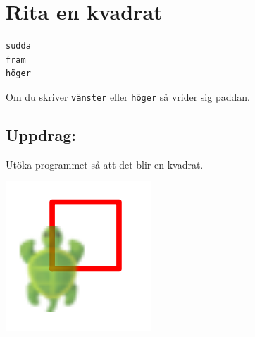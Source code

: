 \chapter{Rita en kvadrat}
\begin{multicols}{2}

\begin{lstlisting}[basicstyle={\ttfamily\fontsize{30}{36}\selectfont},numbers=none]
sudda
fram
höger
\end{lstlisting}
        
Om du skriver \lstinline{vänster} eller \lstinline{höger} så vrider sig paddan.
\section*{\color{BrickRed}Uppdrag:}
Utöka programmet så att det blir en kvadrat.

\columnbreak

\begin{center}
\includegraphics{../img/square.png}
\end{center}

\end{multicols}

